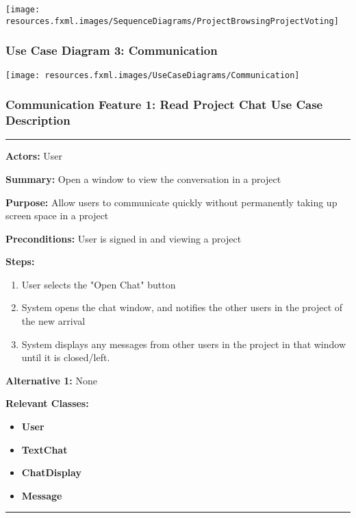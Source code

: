 \documentclass[twoside,letterpaper]{article}
\begin{document}
\texttt{[image: resources.fxml.images/SequenceDiagrams/ProjectBrowsingProjectVoting]}

\newpage

\subsubsection[Use Case Diagram 3: Communication]{\rmfamily\bfseries\color{black}
	Use Case Diagram 3: Communication}

\texttt{[image: resources.fxml.images/UseCaseDiagrams/Communication]}

\newpage

\subsubsection[Communication Feature 1: Read Project Chat Use Case Description]{\rmfamily\bfseries\color{black}
	Communication Feature 1: Read Project Chat Use Case Description}
\hypertarget{RefHeading22059017292}{}

\vspace{2pt}
\hrule
\vspace{8pt}
\textbf{Actors:} User \newline

\noindent\textbf{Summary:} Open a window to view the conversation in a project  \newline

\noindent\textbf{Purpose:} Allow users to communicate quickly without permanently taking up screen space in a project \newline

\noindent\textbf{Preconditions:} User is signed in and viewing a project \newline

\noindent\textbf{Steps:} \begin{enumerate}
	\item User selects the "Open Chat" button
	\item System opens the chat window, and notifies the other users in the project of the new arrival
	\item System displays any messages from other users in the project in that window until it is closed/left.
\end{enumerate}
\noindent\textbf{Alternative 1:} None \newline


\noindent\textbf{Relevant Classes:}
\begin{itemize}
	\item \textbf{User}
	\item \textbf{TextChat}
	\item \textbf{ChatDisplay}
	\item \textbf{Message}
\end{itemize}
\hrule
\newpage
\end{document}
